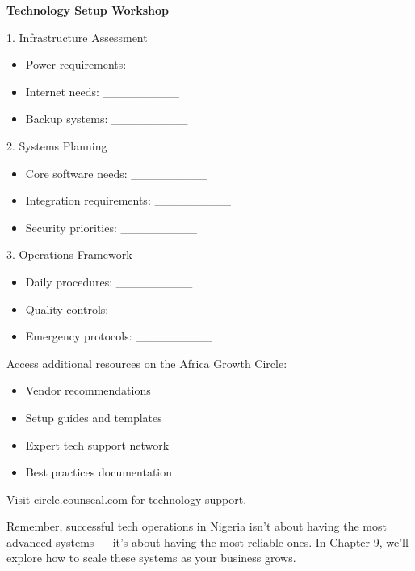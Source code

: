 \begin{workshopbox}
\textbf{Technology Setup Workshop}

1. Infrastructure Assessment
\begin{itemize}
    \item Power requirements: \_\_\_\_\_\_\_\_\_
    \item Internet needs: \_\_\_\_\_\_\_\_\_
    \item Backup systems: \_\_\_\_\_\_\_\_\_
\end{itemize}

2. Systems Planning
\begin{itemize}
    \item Core software needs: \_\_\_\_\_\_\_\_\_
    \item Integration requirements: \_\_\_\_\_\_\_\_\_
    \item Security priorities: \_\_\_\_\_\_\_\_\_
\end{itemize}

3. Operations Framework
\begin{itemize}
    \item Daily procedures: \_\_\_\_\_\_\_\_\_
    \item Quality controls: \_\_\_\_\_\_\_\_\_
    \item Emergency protocols: \_\_\_\_\_\_\_\_\_
\end{itemize}
\end{workshopbox}

\begin{communitybox}
Access additional resources on the Africa Growth Circle:
\begin{itemize}
    \item Vendor recommendations
    \item Setup guides and templates
    \item Expert tech support network
    \item Best practices documentation
\end{itemize}
Visit circle.counseal.com for technology support.
\end{communitybox}

\begin{importantbox}
Remember, successful tech operations in Nigeria isn't about having the most advanced systems --- it's about having the most reliable ones. In Chapter 9, we'll explore how to scale these systems as your business grows.
\end{importantbox}